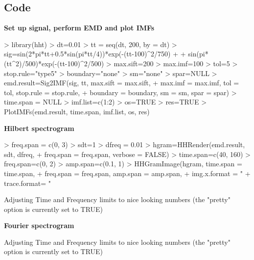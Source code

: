 \documentclass[12pt]{article}
\begin{document}
\subsection{Code}

\textbf{Set up signal, perform EMD and plot IMFs}
\begin{Schunk}
\begin{Sinput}
> library(hht)
> dt=0.01
> tt = seq(dt, 200, by = dt)
> sig=sin(2*pi*tt+0.5*sin(pi*tt/4))*exp(-(tt-100)^2/750) + 
+     sin(pi*(tt^2)/500)*exp(-(tt-100)^2/500)
> max.sift=200
> max.imf=100
> tol=5
> stop.rule="type5"
> boundary="none"
> sm="none"
> spar=NULL
> emd.result=Sig2IMF(sig, tt, max.sift = max.sift,
+     max.imf = max.imf, tol = tol, stop.rule = stop.rule,
+     boundary = boundary, sm = sm, spar = spar)
> time.span = NULL
> imf.list=c(1:2)
> os=TRUE
> res=TRUE
> PlotIMFs(emd.result, time.span, imf.list, os, res)
\end{Sinput}
\end{Schunk}

\textbf{Hilbert spectrogram}

\begin{Schunk}
\begin{Sinput}
> freq.span = c(0, 3)
> sdt=1
> dfreq = 0.01
> hgram=HHRender(emd.result, sdt, dfreq, 
+     freq.span = freq.span, verbose = FALSE)
> time.span=c(40, 160)
> freq.span=c(0, 2)
> amp.span=c(0.1, 1)
> HHGramImage(hgram, time.span = time.span, 
+     freq.span = freq.span, amp.span = amp.span,
+     img.x.format = "%.0f", colorbar.format = "%.1f", 
+     trace.format= "%.1f", img.y.format = "%.1f", pretty = TRUE)
\end{Sinput}
\begin{Soutput}
Adjusting Time and Frequency limits to nice looking numbers (the "pretty" option is currently set to TRUE)
\end{Soutput}
\end{Schunk}

\textbf{Fourier spectrogram}
\begin{Schunk}
\begin{Soutput}
Adjusting Time and Frequency limits to nice looking numbers (the "pretty" option is currently set to TRUE)
\end{Soutput}
\end{Schunk}
\end{document}
